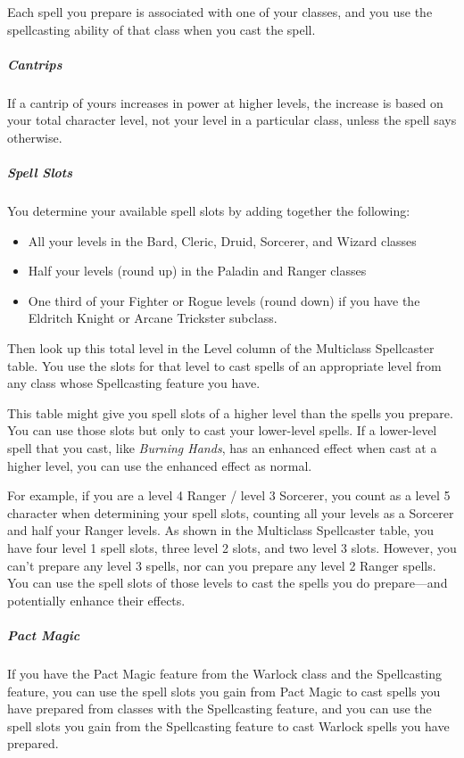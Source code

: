\documentclass[10pt,a4paper,twoside,bg=print,twocolumn,openany,nodeprecatedcode]{dndbook}
\begin{document}
Each spell you prepare is associated with one of your classes, and you use the spellcasting ability of that class when you cast the spell.

\subparagraph{Cantrips}
If a cantrip of yours increases in power at higher levels, the increase is based on your total character level, not your level in a particular class, unless the spell says otherwise.

\subparagraph{Spell Slots}
You determine your available spell slots by adding together the following:


\begin{itemize}
\item All your levels in the Bard, Cleric, Druid, Sorcerer, and Wizard classes
\item Half your levels (round up) in the Paladin and Ranger classes
\item One third of your Fighter or Rogue levels (round down) if you have the Eldritch Knight or Arcane Trickster subclass.
\end{itemize}

Then look up this total level in the Level column of the Multiclass Spellcaster table. You use the slots for that level to cast spells of an appropriate level from any class whose Spellcasting feature you have.

This table might give you spell slots of a higher level than the spells you prepare. You can use those slots but only to cast your lower-level spells. If a lower-level spell that you cast, like \textit{Burning Hands}, has an enhanced effect when cast at a higher level, you can use the enhanced effect as normal.

For example, if you are a level 4 Ranger / level 3 Sorcerer, you count as a level 5 character when determining your spell slots, counting all your levels as a Sorcerer and half your Ranger levels. As shown in the Multiclass Spellcaster table, you have four level 1 spell slots, three level 2 slots, and two level 3 slots. However, you can't prepare any level 3 spells, nor can you prepare any level 2 Ranger spells. You can use the spell slots of those levels to cast the spells you do prepare—and potentially enhance their effects.

\subparagraph{Pact Magic}
If you have the Pact Magic feature from the Warlock class and the Spellcasting feature, you can use the spell slots you gain from Pact Magic to cast spells you have prepared from classes with the Spellcasting feature, and you can use the spell slots you gain from the Spellcasting feature to cast Warlock spells you have prepared.
\end{document}
